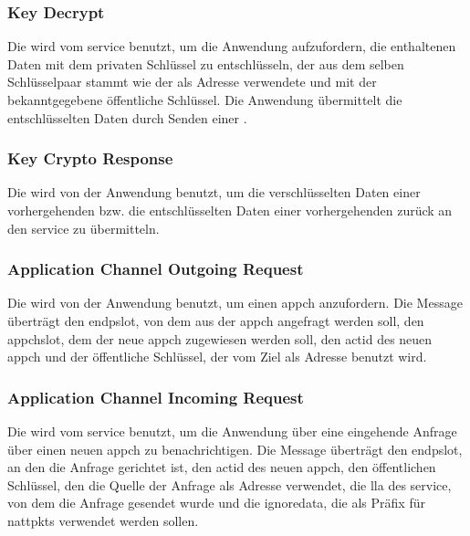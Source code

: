 \asprotokeyencbytefield


\subsubsection{Key Decrypt}
\label{dcl-asproto-keydec}
Die \msg{\asprotokeyenc} wird vom \gls{service} benutzt, um die Anwendung
aufzufordern, die enthaltenen Daten mit dem privaten Schlüssel zu entschlüsseln,
der aus dem selben Schlüsselpaar stammt wie der als Adresse verwendete und mit
der \msg{\asprotoaddrpubkey} bekanntgegebene öffentliche Schlüssel.
Die Anwendung übermittelt die entschlüsselten Daten durch Senden einer
\msg{\asprotocryptoresponse}.

\asprotokeydecbytefield


\subsubsection{Key Crypto Response}
\label{dcl-asproto-cryptoresponse}
Die \msg{\asprotocryptoresponse} wird von der Anwendung benutzt, um die
verschlüsselten Daten einer vorhergehenden \msg{\asprotokeyenc} bzw. die
entschlüsselten Daten einer vorhergehenden \msg{\asprotokeydec} zurück an den
\gls{service} zu übermitteln.

\asprotocryptoresponsebytefield


\subsubsection{Application Channel Outgoing Request}
\label{dcl-asproto-appchoutreq}
Die \msg{\asprotoappchoutreq} wird von der Anwendung benutzt, um einen
\gls{appch} anzufordern. Die Message überträgt den \gls{endpslot}, von dem aus
der \gls{appch} angefragt werden soll, den \gls{appchslot}, dem der neue
\gls{appch} zugewiesen werden soll, den \gls{actid} des neuen \gls{appch} und
der öffentliche Schlüssel, der vom Ziel als Adresse benutzt wird.

\asprotoappchoutreqbytefield


\subsubsection{Application Channel Incoming Request}
\label{dcl-asproto-appchinreq}
Die \msg{\asprotoappchinreq} wird vom \gls{service} benutzt, um die Anwendung
über eine eingehende Anfrage über einen neuen \gls{appch} zu benachrichtigen.
Die Message überträgt den \gls{endpslot}, an den die Anfrage gerichtet ist,
den \gls{actid} des neuen \gls{appch}, den öffentlichen Schlüssel, den die
Quelle der Anfrage als Adresse verwendet, die \gls{lla} des \gls{service}, von
dem die Anfrage gesendet wurde und die \gls{ignoredata}, die als Präfix für
\glspl{nattpkt} verwendet werden sollen.

